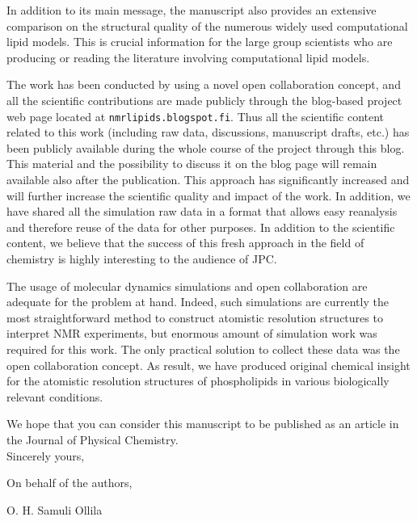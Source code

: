 \documentclass[11pt]{letter}
\begin{document}
In addition to its main message, the manuscript also provides an extensive comparison on the structural quality 
of the numerous widely used computational lipid models. This is crucial information 
for the large group scientists who are producing or reading the literature involving computational lipid models.

The work has been conducted by using a novel open collaboration concept, and all the scientific contributions
are made publicly through the blog-based project web page located at \texttt{nmrlipids.blogspot.fi}. 
Thus all the scientific content related to this work (including raw data, discussions, manuscript drafts, etc.)
has been publicly available during the whole course of the project through this blog. This material and the possibility to 
discuss it on the blog page will remain available also after the publication. This approach has significantly 
increased and will further increase the scientific quality and impact of the work. In addition, we have shared 
all the simulation raw data in a format that allows easy reanalysis and therefore reuse of the data for other purposes. 
In addition to the scientific content, we believe that the success of this fresh approach in the field of chemistry 
is highly interesting to the audience of JPC.

The usage of molecular dynamics simulations and open collaboration are adequate for the
problem at hand. Indeed, such simulations are currently the most straightforward method to 
construct atomistic resolution structures to interpret NMR experiments, but
enormous amount of simulation work was required for this work. The only practical
solution to collect these data was the open collaboration concept.
As result, we have produced original chemical insight for the atomistic resolution 
structures of phospholipids in various biologically relevant conditions.

We hope that you can consider this manuscript to be published as an article in the Journal of Physical Chemistry. \\

Sincerely yours,

On behalf of the authors,

O. H. Samuli Ollila
\end{document}
